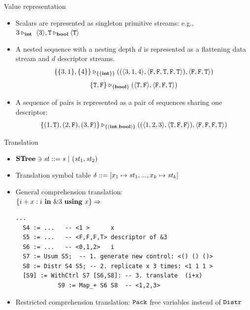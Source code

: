 \documentclass{beamer}
\begin{document}
\begin{frame}{Value representation}
\begin{itemize}
	\item Scalars are represented as singleton primitive streams: e.g., $3 \tr_\int \ \< 3 \'>, \T \tr_\bool \oT $
	
	\item A nested sequence with a nesting depth $d$ is represented as a flattening data stream and $d$ descriptor streams. 
	$$\{\{3,1\}, \{4\}\} \tr_{\{\{\int\}\}} ((\< 3,1,4 \'>, \<\F,\F,\T,\F,\T \'>),\< \F, \F, \T \'>)  $$
	$$\{\T,\F\} \tr_{\{\bool\}} (\< \T,\F\'>, \< \F,\F , \T \'>) $$		
	

\item A sequence of pairs is represented as a pair of sequences sharing one descriptor:
	$$\{(1,\T),(2,\F),(3,\F)\} \tr_{\{(\int,\bool)\}} ((\<1,2,3\'>, \<\T,\F, \F\'>), \< \F,\F,\F,\T \'>)$$
\end{itemize}
\end{frame}


\begin{frame}[fragile]{Translation}
\begin{itemize}
	\item $\STree \ni \st ::= \s \ | \ (\st_1,\st_2) $
	\item Translation symbol table $\del ::= [x_1 \|-> \st_1,..., x_k \|-> {\st_k}] $
	\item General comprehension translation:\\
	$\{i+x : i \ \mathbf{in} \ \&3 \ \mathbf{using} \ x\} \Rightarrow$  
{\footnotesize
	\begin{lstlisting}[style=svcode-style]
  ...
  S4 := ...   -- <1 >      x
  S5 := ...   -- <F,F,F,T> descriptor of &3 
  S6 := ...   -- <0,1,2>   i
  S7 := Usum S5;  -- 1. generate new control: <() () ()>
  S8 := Distr S4 S5; -- 2. replicate x 3 times: <1 1 1 >
  [S9] := WithCtrl S7 [S6,S8]: -- 3. translate  (i+x)
            S9 := Map_+ S6 S8  -- <1,2,3>
\end{lstlisting}
}
	\item Restricted comprehension translation: $\mathtt{Pack}$ free variables instead of $\mathtt{Distr}$
\end{itemize}
\end{frame}
\end{document}

